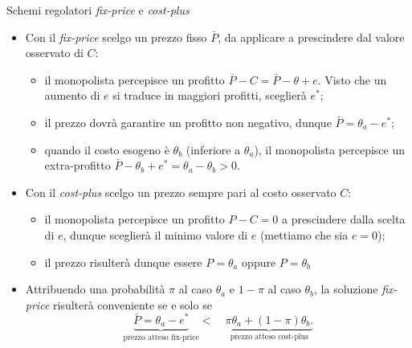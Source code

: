 \documentclass[aspectratio=149,11pt]{beamer}
\begin{document}
\begin{frame}{Schemi regolatori \emph{fix-price} e \emph{cost-plus}}
\begin{itemize}
\item Con il \emph{fix-price} scelgo un prezzo fisso $\bar P$, da applicare a
prescindere dal valore osservato di $C$:
\begin{itemize}
\item il monopolista percepisce un profitto $\bar P - C = \bar P - \theta +
    e$. Visto che un aumento di $e$ si traduce in maggiori profitti, sceglierà
$e^*$;
\item il prezzo dovrà garantire un profitto non negativo, dunque $\bar P=\theta_a-e^*$;
\item quando il costo esogeno è $\theta_b$ (inferiore a $\theta_a$), il
monopolista percepisce un extra-profitto $\bar P-\theta_b+e^*=\theta_a-\theta_b>0$.
\end{itemize}
\item Con il \emph{cost-plus} scelgo un prezzo sempre pari al costo osservato $C$:    
\begin{itemize}
\item il monopolista percepisce un profitto $P-C=0$ a prescindere dalla scelta
di $e$, dunque sceglierà il minimo valore di $e$ (mettiamo che sia $e=0$);
\item il prezzo risulterà dunque essere $P=\theta_a$ oppure $P=\theta_b$
\end{itemize}
\item Attribuendo una probabilità $\pi$ al caso $\theta_a$ e $1-\pi$ al caso
$\theta_b$, la soluzione \emph{fix-price} risulterà conveniente se e solo se
\begin{equation*}
   \underbrace{\bar P=\theta_a-e^*}_{\text{prezzo atteso fix-price}}
   <\quad\underbrace{\pi\theta_a+(1-\pi)\theta_b.}_{\text{prezzo atteso cost-plus}}
\end{equation*}
\end{itemize}
\end{frame}
\end{document}

